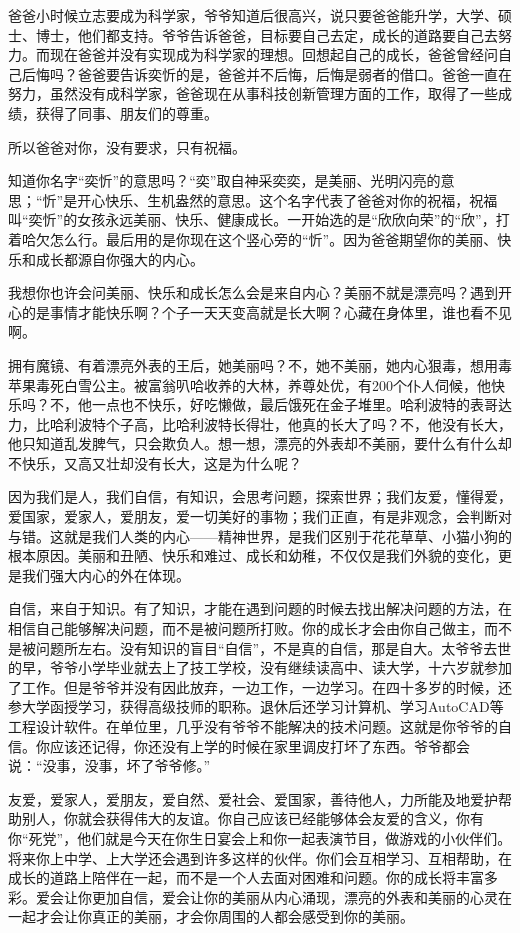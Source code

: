 爸爸小时候立志要成为科学家，爷爷知道后很高兴，说只要爸爸能升学，大学、硕士、博士，他们都支持。爷爷告诉爸爸，目标要自己去定，成长的道路要自己去努力。而现在爸爸并没有实现成为科学家的理想。回想起自己的成长，爸爸曾经问自己后悔吗？爸爸要告诉奕忻的是，爸爸并不后悔，后悔是弱者的借口。爸爸一直在努力，虽然没有成科学家，爸爸现在从事科技创新管理方面的工作，取得了一些成绩，获得了同事、朋友们的尊重。

所以爸爸对你，没有要求，只有祝福。

知道你名字“奕忻”的意思吗？“奕”取自神采奕奕，是美丽、光明闪亮的意思；“忻”是开心快乐、生机盎然的意思。这个名字代表了爸爸对你的祝福，祝福叫“奕忻”的女孩永远美丽、快乐、健康成长。一开始选的是“欣欣向荣”的“欣”，打着哈欠怎么行。最后用的是你现在这个竖心旁的“忻”。因为爸爸期望你的美丽、快乐和成长都源自你强大的内心。

我想你也许会问美丽、快乐和成长怎么会是来自内心？美丽不就是漂亮吗？遇到开心的是事情才能快乐啊？个子一天天变高就是长大啊？心藏在身体里，谁也看不见啊。

拥有魔镜、有着漂亮外表的王后，她美丽吗？不，她不美丽，她内心狠毒，想用毒苹果毒死白雪公主。被富翁叭哈收养的大林，养尊处优，有200个仆人伺候，他快乐吗？不，他一点也不快乐，好吃懒做，最后饿死在金子堆里。哈利波特的表哥达力，比哈利波特个子高，比哈利波特长得壮，他真的长大了吗？不，他没有长大，他只知道乱发脾气，只会欺负人。想一想，漂亮的外表却不美丽，要什么有什么却不快乐，又高又壮却没有长大，这是为什么呢？

因为我们是人，我们自信，有知识，会思考问题，探索世界；我们友爱，懂得爱，爱国家，爱家人，爱朋友，爱一切美好的事物；我们正直，有是非观念，会判断对与错。这就是我们人类的内心——精神世界，是我们区别于花花草草、小猫小狗的根本原因。美丽和丑陋、快乐和难过、成长和幼稚，不仅仅是我们外貌的变化，更是我们强大内心的外在体现。

自信，来自于知识。有了知识，才能在遇到问题的时候去找出解决问题的方法，在相信自己能够解决问题，而不是被问题所打败。你的成长才会由你自己做主，而不是被问题所左右。没有知识的盲目“自信”，不是真的自信，那是自大。太爷爷去世的早，爷爷小学毕业就去上了技工学校，没有继续读高中、读大学，十六岁就参加了工作。但是爷爷并没有因此放弃，一边工作，一边学习。在四十多岁的时候，还参大学函授学习，获得高级技师的职称。退休后还学习计算机、学习AutoCAD等工程设计软件。在单位里，几乎没有爷爷不能解决的技术问题。这就是你爷爷的自信。你应该还记得，你还没有上学的时候在家里调皮打坏了东西。爷爷都会说：“没事，没事，坏了爷爷修。”

友爱，爱家人，爱朋友，爱自然、爱社会、爱国家，善待他人，力所能及地爱护帮助别人，你就会获得伟大的友谊。你自己应该已经能够体会友爱的含义，你有你“死党”，他们就是今天在你生日宴会上和你一起表演节目，做游戏的小伙伴们。将来你上中学、上大学还会遇到许多这样的伙伴。你们会互相学习、互相帮助，在成长的道路上陪伴在一起，而不是一个人去面对困难和问题。你的成长将丰富多彩。爱会让你更加自信，爱会让你的美丽从内心涌现，漂亮的外表和美丽的心灵在一起才会让你真正的美丽，才会你周围的人都会感受到你的美丽。

